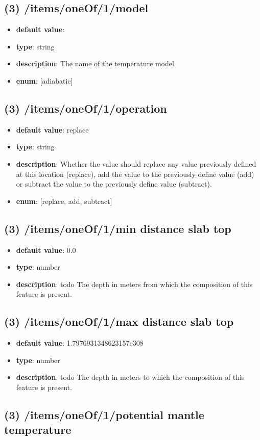 \subsection{(3) /items/oneOf/1/model}
\begin{itemize}[leftmargin=3em]\item {\bf default value}: 
\item {\bf type}: string
\item {\bf description}: The name of the temperature model.
\item {\bf enum}: [adiabatic]\end{itemize}\subsection{(3) /items/oneOf/1/operation}
\begin{itemize}[leftmargin=3em]\item {\bf default value}: replace
\item {\bf type}: string
\item {\bf description}: Whether the value should replace any value previously defined at this location (replace), add the value to the previously define value (add) or subtract the value to the previously define value (subtract).
\item {\bf enum}: [replace, add, subtract]\end{itemize}\subsection{(3) /items/oneOf/1/min distance slab top}
\begin{itemize}[leftmargin=3em]\item {\bf default value}: 0.0
\item {\bf type}: number
\item {\bf description}: todo The depth in meters from which the composition of this feature is present.
\end{itemize}\subsection{(3) /items/oneOf/1/max distance slab top}
\begin{itemize}[leftmargin=3em]\item {\bf default value}: 1.7976931348623157e308
\item {\bf type}: number
\item {\bf description}: todo The depth in meters to which the composition of this feature is present.
\end{itemize}\subsection{(3) /items/oneOf/1/potential mantle temperature}
